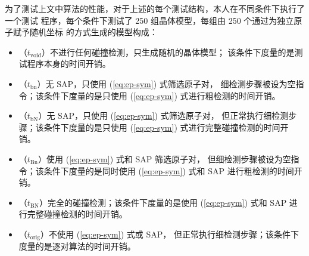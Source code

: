 \begin{table}[htbp!]\bfcmd
{}
\end{table}

为了测试上文中算法的性能，对于上述的每个测试结构，本人在不同条件下执行了一个测试
程序，每个条件下测试了 250 组晶体模型，每组由 250 个通过为独立原子赋予随机坐标
的方式生成的模型构成：
\begin{itemize}
	\item （$t_\text{void}$）不进行任何碰撞检测，只生成随机的晶体模型；
		该条件下度量的是测试程序本身的时间开销。
	\item （$t_\text{bn}$）无 SAP，只使用 (\ref{eq:ep-sym}) 式筛选原子对，
		细检测步骤被设为空指令；该条件下度量的是只使用 (\ref{eq:ep-sym})
		式进行粗检测的时间开销。
	\item （$t_\text{bN}$）无 SAP，只使用 (\ref{eq:ep-sym}) 式筛选原子对，
		但正常执行细检测步骤；该条件下度量的是只使用 (\ref{eq:ep-sym})
		式进行完整碰撞检测的时间开销。
	\item （$t_\text{Bn}$）使用 (\ref{eq:ep-sym}) 式和 SAP 筛选原子对，
		但细检测步骤被设为空指令；该条件下度量的是同时使用
		(\ref{eq:ep-sym}) 式和 SAP 进行粗检测的时间开销。
	\item （$t_\text{BN}$）完全的碰撞检测；该条件下度量的是使用
		(\ref{eq:ep-sym}) 式和 SAP 进行完整碰撞检测的时间开销。
	\item （$t_\text{orig}$）不使用 (\ref{eq:ep-sym}) 式或 SAP，
		但正常执行细检测步骤；该条件下度量的是逐对算法的时间开销。
\end{itemize}

